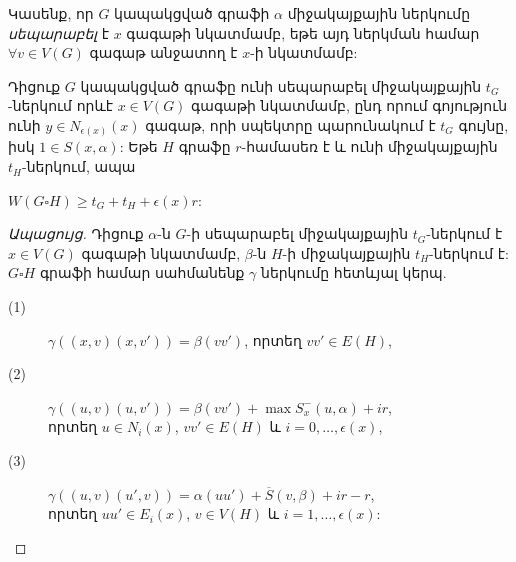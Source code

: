 Կասենք, որ $G$ կապակցված գրաֆի $\alpha$ միջակայքային ներկումը \textit{սեպարաբել} է $x$ գագաթի նկատմամբ, եթե այդ ներկման համար $\forall v \in V(G)$ գագաթ անջատող է $x$-ի նկատմամբ:

\begin{theorem}
\label{t2_separable}
Դիցուք $G$ կապակցված գրաֆը ունի սեպարաբել միջակայքային $t_G$-ներկում որևէ $x\in V(G)$ գագաթի նկատմամբ, ընդ որում գոյություն ունի $y\in N_{\epsilon(x)}(x)$ գագաթ, որի սպեկտրը պարունակում է $t_G$ գույնը, իսկ $1\in S(x,\alpha)$: Եթե $H$ գրաֆը $r$-համասեռ է և ունի միջակայքային $t_H$-ներկում, ապա
\begin{center}
$W(G \square H) \geq t_G + t_H + \epsilon(x)r$:
\end{center}
\end{theorem}
\begin{proof}[Ապացույց]
Դիցուք $\alpha$-ն $G$-ի սեպարաբել միջակայքային $t_G$-ներկում է $x \in V(G)$ գագաթի նկատմամբ, $\beta$-ն $H$-ի միջակայքային $t_H$-ներկում է: $G \square H$ գրաֆի համար սահմանենք $\gamma$ ներկումը հետևյալ կերպ.

\begin{description}
\item[(1)] $\gamma((x,v)(x,v')) = \beta(vv')$, որտեղ $vv' \in E(H)$,
\item[(2)] $\gamma((u,v)(u,v')) = \beta(vv') + \max{S_x^-(u,\alpha)} + i r$,\\ որտեղ $u\in N_i(x)$, $vv' \in E(H)$ և $i=0,\dots,\epsilon(x)$,
\item[(3)] $\gamma((u,v)(u',v)) = \alpha(uu') + \overline{S}(v,\beta) + i r - r$,\\ որտեղ $uu'\in E_i(x)$, $v \in V(H)$ և $i=1,\dots,\epsilon(x)$:
\end{description}


\begin{figure}[t!]
\centering
{}
\end{figure}
\end{proof}
